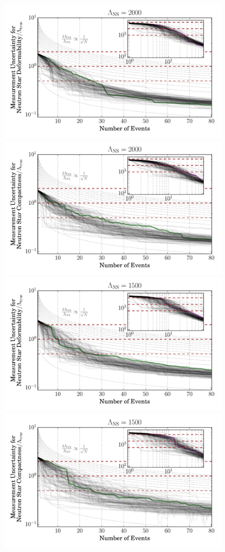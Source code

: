 \documentclass[aps,prd,amsmath,floats,floatfix, twocolumn,
superscriptaddress,nofootinbib,showpacs]{revtex4-1}
\begin{document}
\begin{figure}
\centering    
\includegraphics[width=0.8\columnwidth]{plots/LambdaCIWidths_vs_N_AllPopulations_Log_L2000.pdf}
\includegraphics[width=0.8\columnwidth]{plots/LambdaCIWidths_vs_N_AstroPopulations_Log_L2000.pdf}\\
\includegraphics[width=0.8\columnwidth]{plots/LambdaCIWidths_vs_N_AllPopulations_Log_L1500.pdf}
\includegraphics[width=0.8\columnwidth]{plots/LambdaCIWidths_vs_N_AstroPopulations_Log_L1500.pdf}\\

\end{figure}
\end{document}
